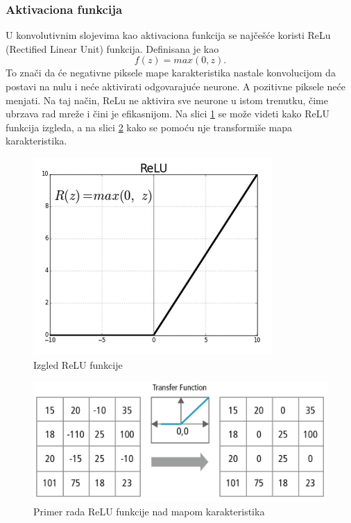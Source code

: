 \documentclass[a4paper]{article}
\begin{document}
\subsubsection{Aktivaciona funkcija}

U konvolutivnim slojevima kao aktivaciona funkcija se najčešće koristi ReLu (Rectified Linear Unit) funkcija. Definisana je kao $$ f(z) = max(0, z). $$ To znači da će negativne piksele mape karakteristika nastale konvolucijom da postavi na nulu i neće aktivirati odgovarajuće neurone. A pozitivne piksele neće menjati. Na taj način, ReLu ne aktivira sve neurone u istom trenutku, čime ubrzava rad mreže i čini je efikasnijom. Na slici \ref{fig:relu_fja} se može videti kako ReLU funkcija izgleda, a na slici \ref{fig:relu_transform} kako se pomoću nje transformiše mapa karakteristika.

\begin{figure}[h!]
\begin{center}
\includegraphics[scale=0.38]{relu2.png}
\end{center}
\caption{Izgled ReLU funkcije}
\label{fig:relu_fja}
\end{figure}


\begin{figure}[h!]
\begin{center}
\includegraphics[scale=0.20]{relu1.jpg}
\end{center}
\caption{Primer rada ReLU funkcije nad mapom karakteristika}
\label{fig:relu_transform}
\end{figure}
\end{document}
